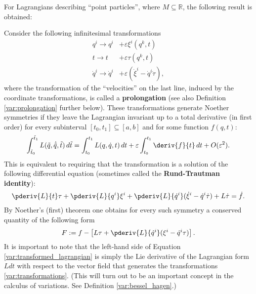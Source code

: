     For Lagrangians describing ``point particles'', where $M\subseteq\mathbb{R}$, the following result is obtained:
    \begin{example}
        Consider the following infinitesimal transformations
        \begin{align}
            q^i\longrightarrow q^i& + \varepsilon\xi^i(q^k,t)\nonumber\\
            t\longrightarrow t& + \varepsilon\tau(q^k,t)\label{var:transformations}\\
            \dot{q}^i\longrightarrow\dot{q}^i& + \varepsilon(\dot{\xi}^i - \dot{q}^i\dot{\tau}),\nonumber
        \end{align}
        where the transformation of the ``velocities'' on the last line, induced by the coordinate transformations, is called a \textbf{prolongation} (see also Definition \ref{var:prolongation} further below). These transformations generate Noether symmetries if they leave the Lagrangian invariant up to a total derivative (in first order) for every subinterval $[t_0,t_1]\subseteq[a,b]$ and for some function $f(q,t)$:
        \begin{gather}
            \int_{\tilde{t}_0}^{\tilde{t}_1}L(\tilde{q},\dot{\tilde{q}}, \tilde{t})\,d\tilde{t} = \int_{t_0}^{t_1}L(q,\dot{q},t)\,dt + \varepsilon\int_{t_0}^{t_1}\deriv{f}{t}\,dt + O(\varepsilon^2).
        \end{gather}
        This is equivalent to requiring that the transformation is a solution of the following differential equation (sometimes called the \textbf{Rund-Trautman identity}):
        \begin{gather}
            \label{var:transformed_lagrangian}
            \pderiv{L}{t}\tau + \pderiv{L}{q^i}\xi^i + \pderiv{L}{\dot{q}^i}(\dot{\xi}^i - \dot{q}^i\dot{\tau}) + L\dot{\tau} = \dot{f}.
        \end{gather}
        By Noether's (first) theorem one obtains for every such symmetry a conserved quantity of the following form
        \begin{gather}
            F := f - \left[L\tau + \pderiv{L}{\dot{q}^i}(\xi^i - \dot{q}^i\tau)\right].
        \end{gather}
        It is important to note that the left-hand side of Equation \eqref{var:transformed_lagrangian} is simply the Lie derivative of the Lagrangian form $Ldt$ with respect to the vector field that generates the transformations \eqref{var:transformations}. (This will turn out to be an important concept in the calculus of variations. See Definition \ref{var:bessel_hagen}.)
    \end{example}

